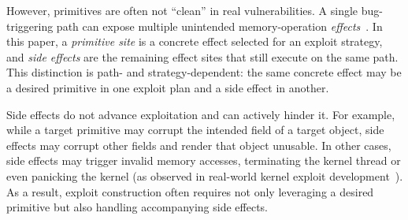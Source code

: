 






However, primitives are often not ``clean'' in real vulnerabilities. A single bug-triggering path can expose multiple unintended memory-operation \emph{effects}~\cite{zou2022syzscope,lin2022grebe}. In this paper, a \emph{primitive site} is a concrete effect selected for an exploit strategy, and \emph{side effects} are the remaining effect sites that still execute on the same path. This distinction is path- and strategy-dependent: the same concrete effect may be a desired primitive in one exploit plan and a side effect in another.

Side effects do not advance exploitation and can actively hinder it. For example, while a target primitive may corrupt the intended field of a target object, side effects may corrupt other fields and render that object unusable. In other cases, side effects may trigger invalid memory accesses, terminating the kernel thread or even panicking the kernel (as observed in real-world kernel exploit development~\cite{CVE-2024-41010,flippingpage}). As a result, exploit construction often requires not only leveraging a desired primitive but also handling accompanying side effects.




